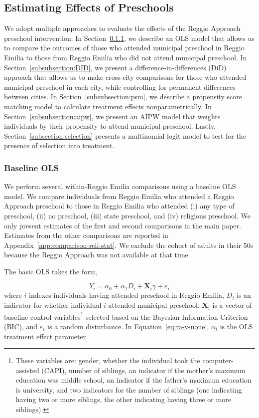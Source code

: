\subsection{Estimating Effects of Preschools}
We adopt multiple approaches to evaluate the effects of the Reggio Approach preschool intervention. In Section~\ref{subsubsection:OLS}, we describe an OLS model that allows us to compare the outcomes of those who attended municipal preschool in Reggio Emilia to those from Reggio Emilia who did not attend municipal preschool. In Section~\ref{subsubsection:DID}, we present a difference-in-differences (DiD) approach that allows us to make cross-city comparisons for those who attended  municipal preschool in each city, while controlling for permanent differences between cities. In Section~\ref{subsubsection:psm}, we describe a propensity score matching model to calculate treatment effects nonparametrically. In Section~\ref{subsubsection:aipw}, we present an AIPW model that weights individuals by their propensity to attend municipal preschool. Lastly, Section~\ref{subsection:selection} presents a multinomial logit model to test for the presence of selection into treatment.

\subsubsection{Baseline OLS} \label{subsubsection:OLS}
We perform several within-Reggio Emilia comparisons using a baseline OLS model. We compare individuals from Reggio Emilia who attended a Reggio Approach preschool to those in Reggio Emilia who attended (i) any type of preschool, (ii) no preschool, (iii) state preschool, and (iv) religious preschool. We only present estimates of the first and second comparisons in the main paper. Estimates from the other comparisons are reported in Appendix~\ref{app:comparison-reli-stat}. We exclude the cohort of adults in their 50s because the Reggio Approach was not available at that time.

The basic OLS takes the form, 

\begin{equation}
	Y_i = \alpha_0 + \alpha_1 D_i + \bm{X}_i\gamma + \varepsilon_i
	\label{eq:ra-v-none}
\end{equation}
where $i$ indexes individuals having attended preschool in Reggio Emilia, $D_i$ is an indicator for whether individual $i$ attended municipal preschool, $\bm{X}_i$ is a vector of baseline control variables\footnote{These variables are: gender, whether the individual took the computer-assisted (CAPI), number of siblings, an indicator if the mother's maximum education was middle school, an indicator if the father's maximum education is university, and two indicators for the number of siblings (one indicating having two or more siblings, the other indicating having three or more siblings).} selected based on the Bayesian Information Criterion (BIC), and $\varepsilon_i$ is a random disturbance. In Equation~\ref{eq:ra-v-none}, $\alpha_i$ is the OLS treatment effect parameter.

